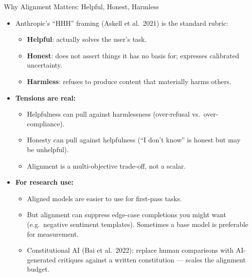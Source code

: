 \begin{frame}{Why Alignment Matters: Helpful, Honest, Harmless}
\begin{itemize}
\item Anthropic's ``HHH'' framing (Askell et al.\ 2021) is the standard rubric:
\begin{itemize}
\item \textbf{Helpful}: actually solves the user's task.
\item \textbf{Honest}: does not assert things it has no basis for; expresses calibrated uncertainty.
\item \textbf{Harmless}: refuses to produce content that materially harms others.
\end{itemize}

\medskip
\item \textbf{Tensions are real:}
\begin{itemize}
\item Helpfulness can pull against harmlessness (over-refusal vs.\ over-compliance).
\item Honesty can pull against helpfulness (``I don't know'' is honest but may be unhelpful).
\item Alignment is a multi-objective trade-off, not a scalar.
\end{itemize}

\medskip
\item \textbf{For research use:}
\begin{itemize}
\item Aligned models are easier to use for first-pass tasks.
\item But alignment can suppress edge-case completions you might want (e.g.\ negative sentiment templates). Sometimes a base model is preferable for measurement.
\item Constitutional AI (Bai et al.\ 2022): replace human comparisons with AI-generated critiques against a written constitution --- scales the alignment budget.
\end{itemize}
\end{itemize}
\end{frame}

